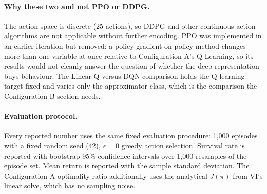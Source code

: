 \paragraph{Why these two and not PPO or DDPG.} The action space is discrete (25 actions), so DDPG and other continuous-action algorithms are not applicable without further encoding. PPO was implemented in an earlier iteration but removed: a policy-gradient on-policy method changes more than one variable at once relative to Configuration A's Q-Learning, so its results would not cleanly answer the question of whether the deep representation buys behaviour. The Linear-Q versus DQN comparison holds the Q-learning target fixed and varies only the approximator class, which is the comparison the Configuration B section needs.

\paragraph{Evaluation protocol.} Every reported number uses the same fixed evaluation procedure: 1{,}000 episodes with a fixed random seed (42), $\epsilon = 0$ greedy action selection. Survival rate is reported with bootstrap 95\% confidence intervals over 1{,}000 resamples of the episode set. Mean return is reported with the sample standard deviation. The Configuration A optimality ratio additionally uses the analytical $J(\pi)$ from VI's linear solve, which has no sampling noise.
